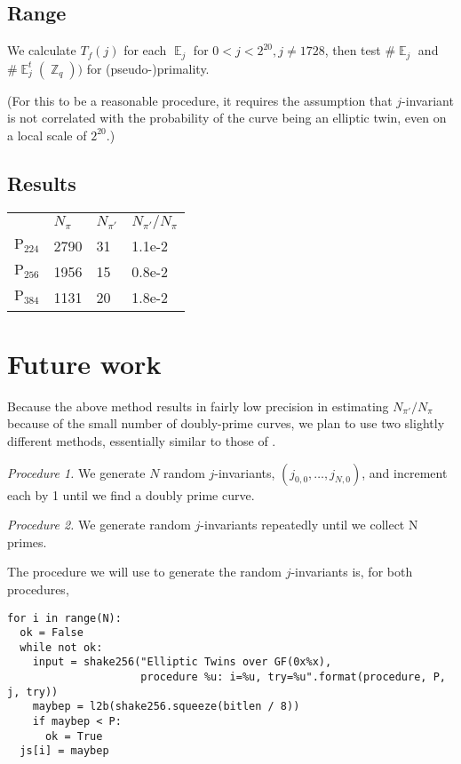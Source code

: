 \documentclass[11pt,fleqn]{article}
\newcommand{\Ejt}{\ensuremath{\BbbE^t_j(\BbbZ_q))} }
\newcommand{\Tf}{\ensuremath{T_f(j)} }
\newcommand{\Pa}{\ensuremath{\mathup{P}_{224}} }
\newcommand{\Pb}{\ensuremath{\mathup{P}_{256}} }
\newcommand{\Pc}{\ensuremath{\mathup{P}_{384}} }
\newcommand{\Ej}{\ensuremath{\BbbE_j} }
\begin{document}
\subsection{Range} 

We calculate \Tf for each \Ej for $0 < j < 2^{20}, j \neq 1728$, then
test $\#\Ej$ and $\#\Ejt$ for (pseudo-)primality.

(For this to be a reasonable procedure, it requires the assumption that
$j$-invariant is not correlated with the probability of the curve being
an elliptic twin, even on a local scale of $2^{20}$.)

\subsection{Results} 

\begin{tabular}[l]{l|lll}
      & $N_{\pi}$ & $N_{\pi'}$ & $N_{\pi'} / N_{\pi}$ \\
  \Pa & 2790 & 31 & 1.1e-2 \\
  \Pb & 1956 & 15 & 0.8e-2 \\
  \Pc & 1131 & 20 & 1.8e-2 \\
\end{tabular}

\section{Future work}

Because the above method results in fairly low precision in estimating
$N_{\pi'} / N_{\pi}$ because of the small number of doubly-prime curves,
we plan to use two slightly different methods, essentially similar to those
of \autocite{ShparlinskiSutantyo}.

\emph{Procedure 1.} We generate $N$ random $j$-invariants,
$(j_{0,0}, \ldots, j_{N,0})$, and increment each by 1 until we
find a doubly prime curve.

\emph{Procedure 2.} We generate random $j$-invariants repeatedly until we collect
N primes.

The procedure we will use to generate the random $j$-invariants is, for both procedures,

{\tiny
\begin{verbatim}
for i in range(N):
  ok = False
  while not ok:
    input = shake256("Elliptic Twins over GF(0x%x),
                     procedure %u: i=%u, try=%u".format(procedure, P, j, try))
    maybep = l2b(shake256.squeeze(bitlen / 8))
    if maybep < P:
      ok = True
  js[i] = maybep
\end{verbatim}
}
\end{document}
